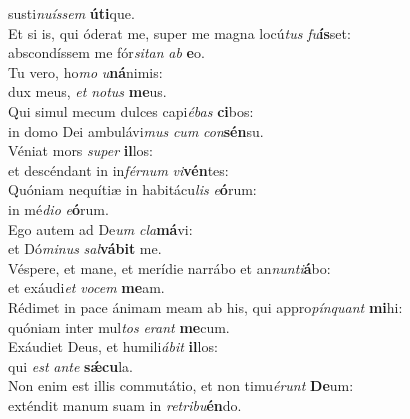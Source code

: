 \evenverse susti\textit{nu}\textit{ís}\textit{sem} \textbf{ú}\textbf{ti}que.\\
\oddverse Et si is, qui óderat me, super me magna locú\textit{tus} \textit{fu}\textbf{ís}set:~\*\\
\oddverse abscondíssem me fór\textit{si}\textit{tan} \textit{ab} \textbf{e}o.\\
\evenverse Tu vero, ho\textit{mo} \textit{u}\textbf{ná}nimis:~\*\\
\evenverse dux meus, \textit{et} \textit{no}\textit{tus} \textbf{me}us.\\
\oddverse Qui simul mecum dulces capi\textit{é}\textit{bas} \textbf{ci}bos:~\*\\
\oddverse in domo Dei ambulávi\textit{mus} \textit{cum} \textit{con}\textbf{sén}su.\\
\evenverse Véniat mors \textit{su}\textit{per} \textbf{il}los:~\*\\
\evenverse et descéndant in in\textit{fér}\textit{num} \textit{vi}\textbf{vén}tes:\\
\oddverse Quóniam nequítiæ in habitácu\textit{lis} \textit{e}\textbf{ó}rum:~\*\\
\oddverse in mé\textit{di}\textit{o} \textit{e}\textbf{ó}rum.\\
\evenverse Ego autem ad De\textit{um} \textit{cla}\textbf{má}vi:~\*\\
\evenverse et Dó\textit{mi}\textit{nus} \textit{sal}\textbf{vá}\textbf{bit} me.\\
\oddverse Véspere, et mane, et merídie narrábo et an\textit{nun}\textit{ti}\textbf{á}bo:~\*\\
\oddverse et exáudi\textit{et} \textit{vo}\textit{cem} \textbf{me}am.\\
\evenverse Rédimet in pace ánimam meam ab his, qui appro\textit{pín}\textit{quant} \textbf{mi}hi:~\*\\
\evenverse quóniam inter mul\textit{tos} \textit{e}\textit{rant} \textbf{me}cum.\\
\oddverse Exáudiet Deus, et humili\textit{á}\textit{bit} \textbf{il}los:~\*\\
\oddverse qui \textit{est} \textit{an}\textit{te} \textbf{sǽ}\textbf{cu}la.\\
\evenverse Non enim est illis commutátio, et non timu\textit{é}\textit{runt} \textbf{De}um:~\*\\
\evenverse exténdit manum suam in \textit{re}\textit{tri}\textit{bu}\textbf{én}do.\\
